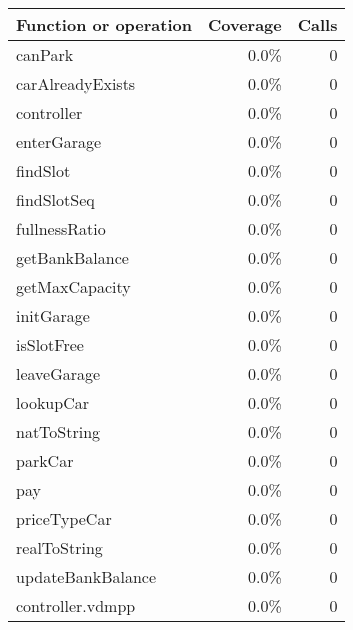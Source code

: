 \documentclass[a4paper]{article}
\begin{document}
\begin{longtable}{|l|r|r|}
\hline
Function or operation & Coverage & Calls \\
\hline
\hline
canPark & 0.0\% & 0 \\
\hline
carAlreadyExists & 0.0\% & 0 \\
\hline
controller & 0.0\% & 0 \\
\hline
enterGarage & 0.0\% & 0 \\
\hline
findSlot & 0.0\% & 0 \\
\hline
findSlotSeq & 0.0\% & 0 \\
\hline
fullnessRatio & 0.0\% & 0 \\
\hline
getBankBalance & 0.0\% & 0 \\
\hline
getMaxCapacity & 0.0\% & 0 \\
\hline
initGarage & 0.0\% & 0 \\
\hline
isSlotFree & 0.0\% & 0 \\
\hline
leaveGarage & 0.0\% & 0 \\
\hline
lookupCar & 0.0\% & 0 \\
\hline
natToString & 0.0\% & 0 \\
\hline
parkCar & 0.0\% & 0 \\
\hline
pay & 0.0\% & 0 \\
\hline
priceTypeCar & 0.0\% & 0 \\
\hline
realToString & 0.0\% & 0 \\
\hline
updateBankBalance & 0.0\% & 0 \\
\hline
\hline
controller.vdmpp & 0.0\% & 0 \\
\hline
\end{longtable}
\end{document}

